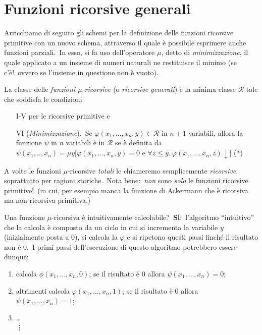 \section{Funzioni ricorsive generali}

Arricchiamo di seguito gli schemi per la definizione delle funzioni ricorsive primitive con un nuovo schema, attraverso il quale è possibile esprimere anche funzioni parziali.\
In esso, si fa uso dell'operatore $\mu$, detto di \textit{minimizzazione}, il quale applicato a un insieme di numeri naturali ne restituisce il minimo (se c'è!\ ovvero se l'insieme in questione non è vuoto).

\begin{definition}[Funzioni $\mu$-ricorsive]

    La classe delle \textit{funzioni $\mu$-ricorsive} (o \textit{ricorsive generali}) è la minima classe $\mathcal{R}$ tale che soddisfa le condizioni
    \begin{itemize}
        \item[I-V] per le ricorsive primitive e
        \item[VI] (\textit{Minimizzazione}).\ Se $\varphi(x_1,...,x_n,y)\in \mathcal{R}$ in $n+1$ variabili, allora la funzione $\psi$ in $n$ variabili è in $\mathcal{R}$ se è definita da
              \subitem $\psi(x_1,..,x_n)=\mu y[\varphi(x_1,\dots,x_n,y)=0$ e
                              \subsubitem  $\forall z \leq y.\ \varphi(x_1,\dots,x_n,z)\downarrow]$ \hfill ($*$)
    \end{itemize}

    \noindent A volte le funzioni $\mu$-ricorsive \textit{totali} le chiameremo semplicemente \textit{ricorsive}, soprattutto per ragioni storiche.\
    Nota bene:\ \textit{non} sono \textit{solo} le funzioni ricorsive primitive!\ (in cui, per esempio manca la funzione di Ackermann che è ricorsiva ma non ricorsiva primitiva.)
\end{definition}

\noindent Una funzione $\mu$-ricorsiva è intuitivamente calcolabile?\
\textbf{Sì}:\ l'algoritmo ``intuitivo'' che la calcola è composto da un ciclo in cui si incrementa la variabile $y$ (inizialmente posta a 0), si calcola la $\varphi$ e si ripetono questi passi finché il risultato non è 0.\
I primi passi dell'esecuzione di questo algoritmo potrebbero essere dunque:

\begin{enumerate}
    \item calcola $\phi(x_1, \dots, x_n, 0)$; se il risultato è 0 allora $\psi(x_1, \dots, x_n) = 0$;
    \item altrimenti calcola $\varphi(x_1,\dots, x_n,1)$; se il risultato è 0 allora\\$\psi(x_1,\dots,x_n) = 1$;
    \item \dots\\ \vdots
\end{enumerate}

